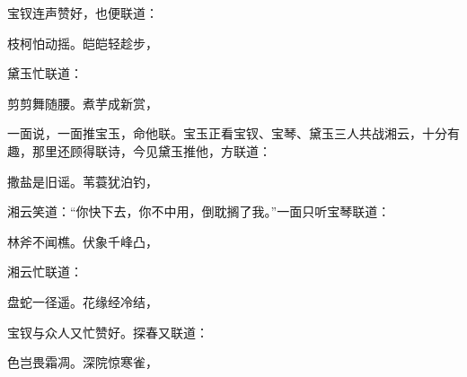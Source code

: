 \begin{parag}
    宝钗连声赞好，也便联道：
\end{parag}


\begin{poem}
    \begin{pl} 枝柯怕动摇。皑皑轻趁步，\end{pl}
\end{poem}


\begin{parag}
    黛玉忙联道：
\end{parag}


\begin{poem}
    \begin{pl} 剪剪舞随腰。煮芋成新赏，\end{pl}
\end{poem}


\begin{parag}
    一面说，一面推宝玉，命他联。宝玉正看宝钗、宝琴、黛玉三人共战湘云，十分有趣，那里还顾得联诗，今见黛玉推他，方联道：
\end{parag}


\begin{poem}
    \begin{pl} 撒盐是旧谣。苇蓑犹泊钓，\end{pl}
\end{poem}


\begin{parag}
    湘云笑道：“你快下去，你不中用，倒耽搁了我。”一面只听宝琴联道：
\end{parag}


\begin{poem}
    \begin{pl} 林斧不闻樵。伏象千峰凸，\end{pl}
\end{poem}


\begin{parag}
    湘云忙联道：
\end{parag}


\begin{poem}
    \begin{pl} 盘蛇一径遥。花缘经冷结，\end{pl}
\end{poem}


\begin{parag}
    宝钗与众人又忙赞好。探春又联道：
\end{parag}


\begin{poem}
    \begin{pl} 色岂畏霜凋。深院惊寒雀，\end{pl}
\end{poem}


